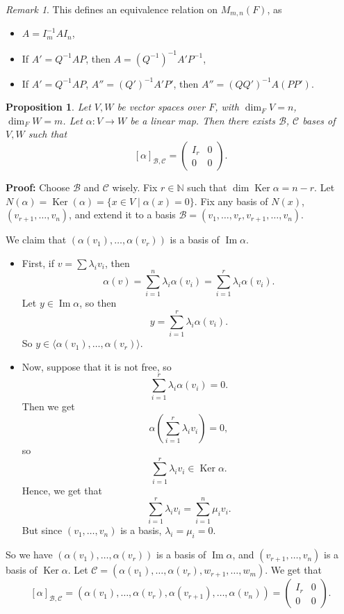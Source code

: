 \documentclass[12pt]{article}
\DeclareMathOperator{\Ker}{Ker}
\DeclareMathOperator{\Img}{Im}
\newtheorem{proposition}{Proposition}[section]
\theoremstyle{definition}
\theoremstyle{remark}
\newtheorem*{remark}{Remark}
\begin{document}
\begin{remark}
	This defines an equivalence relation on $M_{m, n}(F)$, as
	\begin{itemize}
		\item $A = I_m^{-1}AI_n$,
		\item If $A' = Q^{-1}AP$, then $A = (Q^{-1})^{-1}A' P^{-1}$,
		\item If $A' = Q^{-1}AP$, $A'' = (Q')^{-1}A'P'$, then $A'' = (QQ')^{-1}A(PP')$.
	\end{itemize}
	
\end{remark}

\begin{proposition}
	Let $V, W$ be vector spaces over $F$, with $\dim_F V = n$, $\dim_F W = m$. Let $\alpha : V \to W$ be a linear map. Then there exists $\mathcal{B}$, $\mathcal{C}$ bases of $V, W$ such that
	\[
		[\alpha]_{\mathcal{B}, \mathcal{C}} =
		\begin{pmatrix}
			I_r & 0 \\
			0 & 0
		\end{pmatrix}
	.\]
\end{proposition}

\begin{adjustbox}{minipage = \columnwidth - 25.5pt, margin=1em, frame=1pt, margin=0em}
	\textbf{Proof:} Choose $\mathcal{B}$ and $\mathcal{C}$ wisely. Fix $r \in \mathbb{N}$ such that $\dim \Ker \alpha = n - r$. Let $N(\alpha) = \Ker(\alpha) = \{x \in V \mid \alpha(x) = 0\}$. Fix any basis of $N(x)$, $(v_{r+1}, \ldots, v_n)$, and extend it to a basis $\mathcal{B} = (v_1, \ldots, v_r, v_{r+1}, \ldots, v_n)$.

	We claim that $(\alpha(v_1), \ldots, \alpha(v_r))$ is a basis of $\Img \alpha$.
	\begin{itemize}
		\item First, if $v = \sum \lambda_i v_i$, then
			\[
				\alpha(v) = \sum_{i = 1}^{n} \lambda_i \alpha(v_i) = \sum_{i = 1}^{r} \lambda_i \alpha(v_i)
			.\]
			Let $y \in \Img \alpha$, so then
			\[
				y = \sum_{i = 1}^{r} \lambda_i \alpha(v_i)
			.\]
			So $y \in \langle \alpha(v_1), \ldots, \alpha(v_r)\rangle$.
		\item Now, suppose that it is not free, so
			\[
				\sum_{i = 1}^{r} \lambda_i \alpha(v_i) = 0
			.\]
			Then we get
			\[
				\alpha\left( \sum_{i = 1}^{r} \lambda_i v_i \right) = 0
			,\]
			so
			\[
			\sum_{i = 1}^{r} \lambda_i v_i \in \Ker \alpha
			.\]
			Hence, we get that
			\[
			\sum_{i = 1}^{r} \lambda_i v_i = \sum_{i = 1}^{n} \mu_i v_i
			.\]
			But since $(v_1, \ldots, v_n)$ is a basis, $\lambda_i = \mu_i = 0$.
	\end{itemize}
	So we have $(\alpha(v_1), \ldots, \alpha(v_r))$ is a basis of $\Img \alpha$, and $(v_{r+1}, \ldots, v_{n})$ is a basis of $\Ker \alpha$. Let $\mathcal{C} = (\alpha(v_1), \ldots, \alpha(v_r), w_{r+1}, \ldots, w_{m})$. We get that
	\[
		[\alpha]_{\mathcal{B}, \mathcal{C}} = (\alpha(v_1), \ldots, \alpha(v_r), \alpha(v_{r+1}), \ldots, \alpha(v_n)) =
		\begin{pmatrix}
			I_r & 0 \\
			0 & 0
		\end{pmatrix}	
	.\]
\end{adjustbox}
\end{document}
